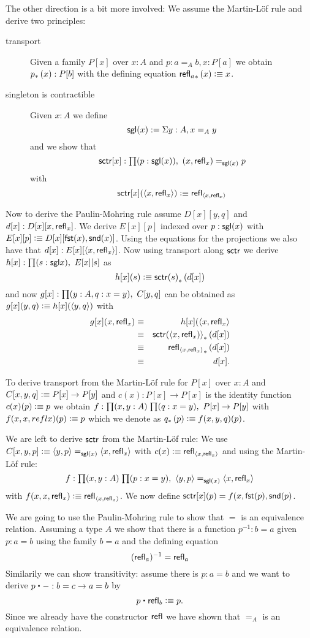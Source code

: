 The other direction is a bit more involved: We assume the Martin-L\"of
rule and derive two principles:
\begin{description}
\item[transport] Given a family $P[x]$ over
$x:A$ and $p : a =_A b, x : P[a]$ we obtain ${p}_{*}\left({x}\right) : P[b]$ with
the defining equation ${\mathsf{refl}_{a}}_{*}\left({x}\right) \vcentcolon\equiv x$.
\item[singleton is contractible]  Given $x:A$ we define 
\[ \mathsf{sgl}(x) := \Sigma y:A, x =_A y \]
and we show that 
\[\sctr[x] : \prd{p : \sgl(x)} (x,\refl{x}) =_{\sgl(x)}  p \]
with
\[ \mathsf{sctr}[x](\langle x,\mathsf{refl}_{x}\rangle) \vcentcolon\equiv \mathsf{refl}_{\langle x,\mathsf{refl}_{x}\rangle} \]
\end{description}
Now to derive the Paulin-Mohring rule assume $D[x][y,q]$ and
$d[x]:D[x][x,\mathsf{refl}_{x}]$. We derive $E[x][p]$ indexed over $p:\mathsf{sgl}(x)$
with $E[x][p] \vcentcolon\equiv D[x][\mathsf{fst}(x),\mathsf{snd}(x)]$. Using the equations for
the projections we also have that $d[x] : E[x][\langle x,\mathsf{refl}_{x}\rangle]$.
Now using transport along $\mathsf{sctr}$ we derive 
$h[x] : \prd{s : \sgl{x}}E[x][s]$ as 
\[h[x](s) \defeq \trans{\sctr(s)}{d[x]}\]
and now $g[x]:\prd{y:A,q:x = y}C[y,q]$ can be obtained as
$g[x](y,q) \vcentcolon\equiv h[x](\langle y,q\rangle)$ with 
\begin{eqnarray*}
g[x](x , \mathsf{refl}_{x}) & \equiv & h[x](\langle x,\mathsf{refl}_{x}\rangle \\
& \equiv & {\mathsf{sctr}(\langle x,\mathsf{refl}_{x})\rangle}_{*}\left({d[x]}\right)\\
& \equiv & {\mathsf{refl}_{\langle x,\mathsf{refl}_{x}\rangle}}_{*}\left({d[x]}\right)\\
& \equiv & d[x].
\end{eqnarray*}

To derive transport from the Martin-L\"of rule for $P[x]$ over
$x:A$ and $C[x,y,q]\vcentcolon\equiv P[x] \to P[y]$ and $c(x) : P[x] \to P[x]$ is
the identity function $c(x)(p) \vcentcolon\equiv p$ we obtain 
$f : \prd{x,y:A}{q : x = y} P[x] \to P[y]$ with
$f (x,x,refl{x})(p) \vcentcolon\equiv p$ which we denote as 
${q}_{*}\left({p}\right) \vcentcolon\equiv f(x,y,q)(p)$.

We are left to derive $\mathsf{sctr}$ from the Martin-L\"of rule:
We use $C[x,y,p] \vcentcolon\equiv \langle y,p\rangle =_{\mathsf{sgl}(x)} \langle x,\mathsf{refl}_{x}\rangle$
with $c(x) \vcentcolon\equiv \mathsf{refl}_{\langle x,\mathsf{refl}_{x}\rangle}$ and using the Martin-L\"of
  rule: 
\[f : \prd{x,y:A}{p:x = y} \tup{y}{p} =_{\sgl(x)} \tup{x}{\refl{x}}\]
 with $f(x,x,\mathsf{refl}_{x}) \vcentcolon\equiv \mathsf{refl}_{\langle x,\mathsf{refl}_{x}\rangle}$. We now define
$\mathsf{sctr}[x](p) = f(x,\mathsf{fst}(p),\mathsf{snd}(p)$.

We are going to use the Paulin-Mohring rule to show that $=$ is an
equivalence relation. Assuming a type $A$ we show that there is a function
$p^{-1} : b = a$ given $p : a = b$ using the family $b = a$ and
the defining equation
\[ (\mathsf{refl}_{a})^{-1} = \mathsf{refl}_{a} \]
Similarily we can show transitivity: assume there is $p : a = b$ and
we want to derive $p \ct - : b = c \to a = b$ by
\[ p \ct \refl{b} \defeq p.\]
Since we already have the constructor $\mathsf{refl}_{}$ we have shown that $=_A$
is an equivalence relation. 

